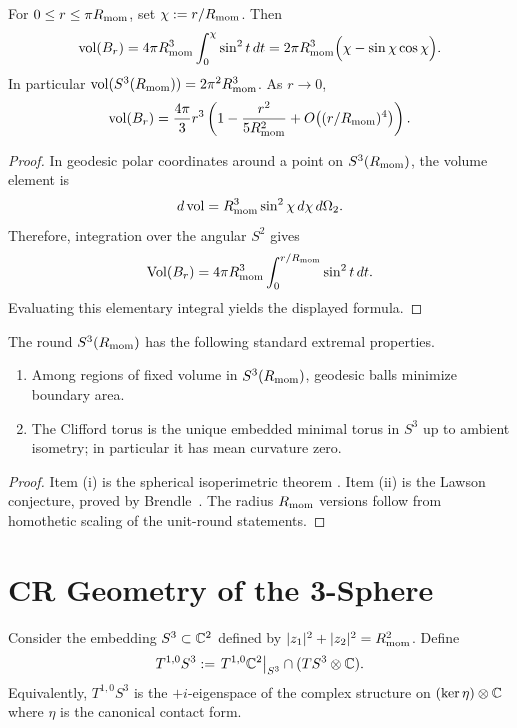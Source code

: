 \documentclass[11pt]{article}
\begin{document}
\begin{corollary}
\label{p1a:corollary:atlas-volume-of-a-geodesic-ball-in-s-3-700f05e}

For $0\le r\le \pi R_{\mathrm{mom}}$, set $\chi:=r/R_{\mathrm{mom}}$. Then
\[
\operatorname{vol}(B_r)=4\pi R_{\mathrm{mom}}^3\int_{0}^{\chi}\sin^2 t\,dt
=2\pi R_{\mathrm{mom}}^3\Bigl(\chi-\sin\chi\cos\chi\Bigr).
\]
In particular $\operatorname{vol}(S^3(R_{\mathrm{mom}}))=2\pi^2R_{\mathrm{mom}}^3$. As $r\to 0$,
\[
\operatorname{vol}(B_r)=\frac{4\pi}{3}r^3\left(1-\frac{r^2}{5R_{\mathrm{mom}}^2}+O\!\left((r/R_{\mathrm{mom}})^4\right)\right).
\]
\cite{do1992riemannian}
\end{corollary}

\begin{proof}
In geodesic polar coordinates around a point on \(S^3(R_{\mathrm{mom}})\), the volume
element is
\[
  d\operatorname{vol}=R_{\mathrm{mom}}^3\sin^2\chi\,d\chi\,d\Omega_2.
\]
Therefore, integration over the angular \(S^2\) gives
\[
  \operatorname{Vol}(B_r)
  =4\pi R_{\mathrm{mom}}^3\int_0^{r/R_{\mathrm{mom}}}\sin^2 t\,dt.
\]
Evaluating this elementary integral yields the displayed formula.
\end{proof}


\begin{theorem}
\label{p1:thm:round-extremal-facts}
The round $S^3(R_{\mathrm{mom}})$ has the following standard extremal properties.
\begin{enumerate}[label=(\roman*)]
\item Among regions of fixed volume in $S^3(R_{\mathrm{mom}})$, geodesic balls minimize boundary area.
\item The Clifford torus is the unique embedded minimal torus in $S^3$ up to ambient isometry; in particular it has mean curvature zero.
\end{enumerate}
\end{theorem}

\begin{proof}
Item (i) is the spherical isoperimetric theorem
\cite{schmidt1943isoperimetrische}.  Item (ii) is the Lawson conjecture,
proved by Brendle~\cite{brendle2013lawson}.  The radius \(R_{\mathrm{mom}}\) versions
follow from homothetic scaling of the unit-round statements.
\end{proof}


\section{CR Geometry of the 3-Sphere}
\label{p1:subsec:cr-structure}

Consider the embedding $S^3 \subset \mathbb{C}^2$ defined by $|z_1|^2+|z_2|^2=R_{\mathrm{mom}}^2$.
Define
\[
T^{1,0}S^3 := \left.T^{1,0}\mathbb{C}^2\right|_{S^3} \cap (TS^3\otimes \mathbb{C}).
\]
Equivalently, \(T^{1,0}S^3\) is the \(+i\)-eigenspace of the complex structure on \((\ker\eta)\otimes \mathbb{C}\) where $\eta$ is the canonical contact form.
\end{document}
